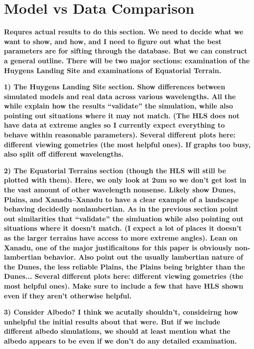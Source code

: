 \documentclass[twocolumn,linenumbers]{aastex631}
\begin{document}
\section{Model vs Data Comparison} \label{sec:compare}

\textbf{\color{blue}Requres actual results to do this section. We need to decide what we want to show, and how, and I need to figure out what the best parameters are for sifting through the database. But we can construct a general outline. There will be two major sections: examination of the Huygens Landing Site and examinations of Equatorial Terrain. \color{black}}

\textbf{\color{blue}1) The Huygens Landing Site section. Show differences between simulated models and real data across various wavelengths. All the while explain how the results ``validate'' the simulation, while also pointing out situations where it may not match. (The HLS does not have data at extreme angles so I currently expect everything to behave within reasonable parameters). Several different plots here: different viewing gometries (the most helpful ones). If graphs too busy, also split off different wavelengths. \color{black}}

\textbf{\color{blue}2) The Equatorial Terrains section (though the HLS will still be plotted with them). Here, we only look at 2um so we don't get lost in the vast amount of other wavelength nonsense. Likely show Dunes, Plains, and Xanadu--Xanadu to have a clear example of a landscape behaving decidedly nonlambertian. As in the previous section point out similarities that ``validate'' the simluation while also pointing out situations where it doesn't match. (I expect a lot of places it doesn't as the larger terrains have access to more extreme angles). Lean on Xanadu, one of the major justificaitons for this paper is obviously non-lambertian behavior. Also point out the usually lambertian nature of the Dunes, the less reliable Plains, the Plains being brighter than the Dunes... Several different plots here: different viewing gometries (the most helpful ones). Make sure to include a few that have HLS shown even if they aren't otherwise helpful. \color{black}}

\textbf{\color{blue}3) Consider Albedo? I think we acutally shouldn't, consideirng how unhelpful the initial results about that were. But if we include different albedo simulations, we should at least mention what the albedo appears to be even if we don't do any detailed examination. \color{black}}
\end{document}
